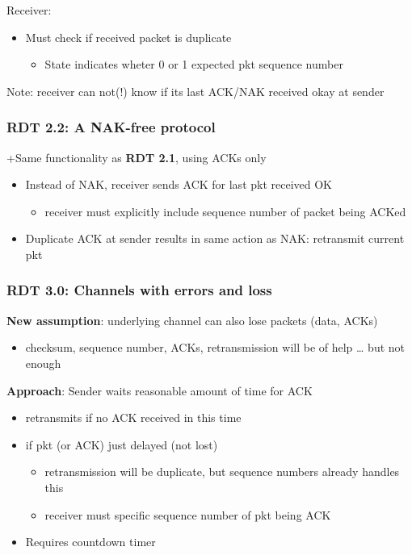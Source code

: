 \documentclass[11pt]{article}
\begin{document}
Receiver: 
\begin{itemize}
\item Must check if received packet is duplicate
\begin{itemize}
\item State indicates wheter 0 or 1 expected pkt sequence number
\end{itemize}
\end{itemize}

Note: receiver can not(!) know if its last ACK/NAK received okay at
sender 

\subsubsection{RDT 2.2: A NAK-free protocol}
\label{sec:orgdd6cc63}

+Same functionality as \textbf{RDT 2.1}, using ACKs only 
\begin{itemize}
\item Instead of NAK, receiver sends ACK for last pkt received OK
\begin{itemize}
\item receiver must explicitly include sequence number of packet being
ACKed
\end{itemize}
\item Duplicate ACK at sender results in same action as NAK: retransmit
current pkt
\end{itemize}

\subsubsection{RDT 3.0: Channels with errors and loss}
\label{sec:orgdc3d164}

\textbf{New assumption}: underlying channel can also lose packets (data,
ACKs)
\begin{itemize}
\item checksum, sequence number, ACKs, retransmission will be of help
\ldots{} but not enough
\end{itemize}

\textbf{Approach}: Sender waits reasonable amount of time for ACK
\begin{itemize}
\item retransmits if no ACK received in this time
\item if pkt (or ACK) just delayed (not lost)
\begin{itemize}
\item retransmission will be duplicate, but sequence numbers already
handles this
\item receiver must specific sequence number of pkt being ACK
\end{itemize}
\item Requires countdown timer
\end{itemize}
\end{document}
